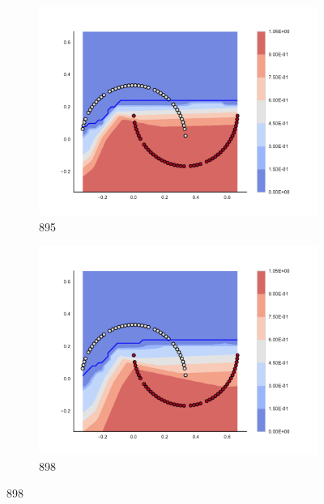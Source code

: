 \begin{figure}[h]
\begin{subfigure}[b]{0.09\textwidth}
    \includegraphics[clip, trim=2.35cm 1.75cm 4.5cm 0cm,width=\textwidth]{img/convergence/895.pdf}
    \caption{895}
    \label{fig:convergence_895}
\end{subfigure}
%
\begin{subfigure}[b]{0.09\textwidth}
    \includegraphics[clip, trim=2.35cm 1.75cm 4.5cm 0cm,width=\textwidth]{img/convergence/898.pdf}
    \caption{898}
    \label{fig:convergence_898}
\end{subfigure}
%
        \end{figure}
